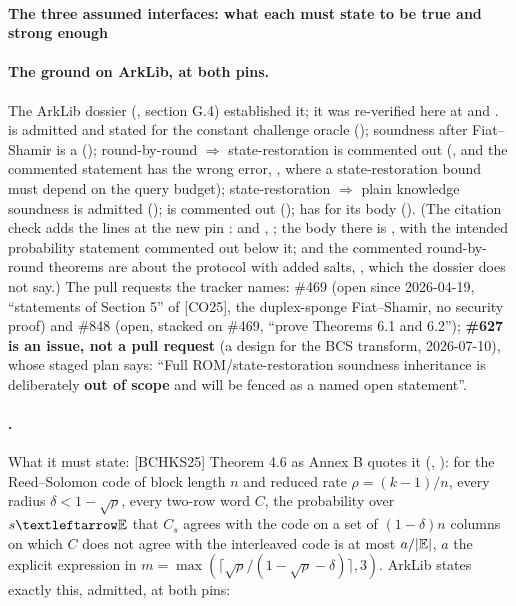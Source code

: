 \paragraph{The three assumed interfaces: what each must state to be true and strong enough}\label{sec:gen-opening-interfaces}

\begin{sloppypar}
\paragraph{The ground on ArkLib, at both pins.} The ArkLib dossier (,
section G.4) established it; it was re-verified here at  and .
 is admitted and stated for the constant challenge oracle
(); soundness after Fiat--Shamir is a  ();
round-by-round $⇒$ state-restoration is commented out (,
and the commented statement has the wrong error, , where a state-restoration
bound must depend on the query budget); state-restoration $⇒$ plain knowledge soundness is admitted
();  is commented out ();
 has  for its body
(). (The citation check adds the lines at the new pin
:  and ,
; the body there is
, with the intended probability statement
commented out below it; and the commented round-by-round theorems are about the protocol with added
salts, , which the dossier does not say.) The pull requests the tracker names: \#469
(open since 2026-04-19, ``statements of Section 5'' of [CO25], the duplex-sponge Fiat--Shamir, no
security proof) and \#848 (open, stacked on \#469, ``prove Theorems 6.1 and 6.2'');
\textbf{\#627 is an issue, not a pull request} (a design for the BCS transform, 2026-07-10), whose
staged plan says: ``Full ROM/state-restoration soundness inheritance is deliberately \textbf{out of
scope} and will be fenced as a named open statement''.
\end{sloppypar}

\paragraph{.} What it must state: [BCHKS25] Theorem 4.6 as Annex B quotes it
(, ): for the Reed--Solomon code of block length $n$ and
reduced rate $ρ = (k−1)/n$, every radius $δ < 1 − \sqrt{ρ}$, every two-row word $C$, the probability
over $s ← \E$ that $C_s$ agrees with the code on a set of $(1−δ)n$ columns on which $C$ does not
agree with the interleaved code is at most $a/\lvert \mathbb{E}\rvert$, $a$ the explicit expression in
$m = \max(⌈\sqrt{ρ}/(1−\sqrt{ρ}−δ)⌉, 3)$. ArkLib states exactly this, admitted, at both pins:

